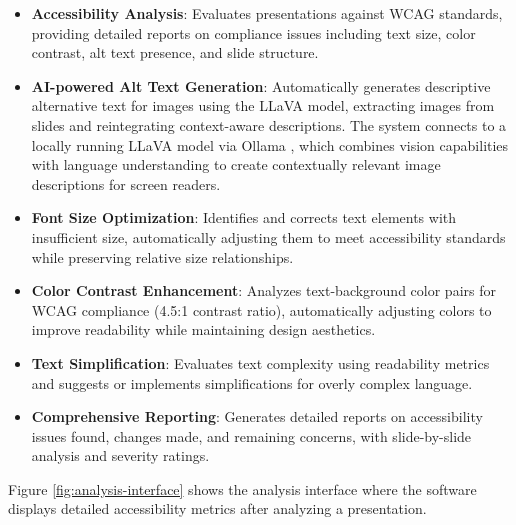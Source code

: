 \documentclass[preprint,review,12pt]{elsarticle} %
\begin{document}
\begin{itemize}
    \item \textbf{Accessibility Analysis}: Evaluates presentations against WCAG \cite{wcag} standards, providing detailed reports on compliance issues including text size, color contrast, alt text presence, and slide structure.
    
    \item \textbf{AI-powered Alt Text Generation}: Automatically generates descriptive alternative text for images using the LLaVA \cite{llava} model, extracting images from slides and reintegrating context-aware descriptions. The system connects to a locally running LLaVA model via Ollama \cite{ollama}, which combines vision capabilities with language understanding to create contextually relevant image descriptions for screen readers.
    
    \item \textbf{Font Size Optimization}: Identifies and corrects text elements with insufficient size, automatically adjusting them to meet accessibility standards while preserving relative size relationships.
    
    \item \textbf{Color Contrast Enhancement}: Analyzes text-background color pairs for WCAG compliance (4.5:1 contrast ratio), automatically adjusting colors to improve readability while maintaining design aesthetics.
    
    \item \textbf{Text Simplification}: Evaluates text complexity using readability metrics and suggests or implements simplifications for overly complex language.
    
    \item \textbf{Comprehensive Reporting}: Generates detailed reports on accessibility issues found, changes made, and remaining concerns, with slide-by-slide analysis and severity ratings.
\end{itemize}

Figure \ref{fig:analysis-interface} shows the analysis interface where the software displays detailed accessibility metrics after analyzing a presentation.
\end{document}

